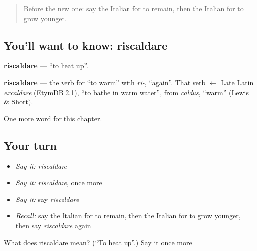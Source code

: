 \label{lesson:IT-C147-riscaldare}



\begin{quote}
Before the new one: say the Italian for to remain, then the Italian for to grow younger.
\end{quote}

\subsection*{You'll want to know: riscaldare}
\textbf{riscaldare} — \textquotedblleft{}to heat up\textquotedblright{}.

\begin{cousinweb}
\textbf{riscaldare} — the verb for \textquotedblleft{}to warm\textquotedblright{} with \emph{ri-}, \textquotedblleft{}again\textquotedblright{}. That verb $\leftarrow$ Late Latin \emph{excaldare} (EtymDB 2.1), \textquotedblleft{}to bathe in warm water\textquotedblright{}, from \emph{caldus}, \textquotedblleft{}warm\textquotedblright{} (Lewis \& Short).
\end{cousinweb}

\begin{grammarlens}[title={What you've built}]
One more word for this chapter.
\end{grammarlens}

\subsection*{Your turn}
\begin{itemize}
\raggedright
  \item \emph{Say it:} \emph{riscaldare}
  \item \emph{Say it:} \emph{riscaldare}, once more
  \item \emph{Say it:} say \emph{riscaldare}
  \item \emph{Recall:} say the Italian for to remain, then the Italian for to grow younger, then say \emph{riscaldare} again
\end{itemize}

\begin{tcolorbox}[breakable,colback=teal!4,colframe=teal!35!black,title={Before you move on}]
What does riscaldare mean? (\textquotedblleft{}To heat up\textquotedblright{}.) Say it once more.
\end{tcolorbox}
